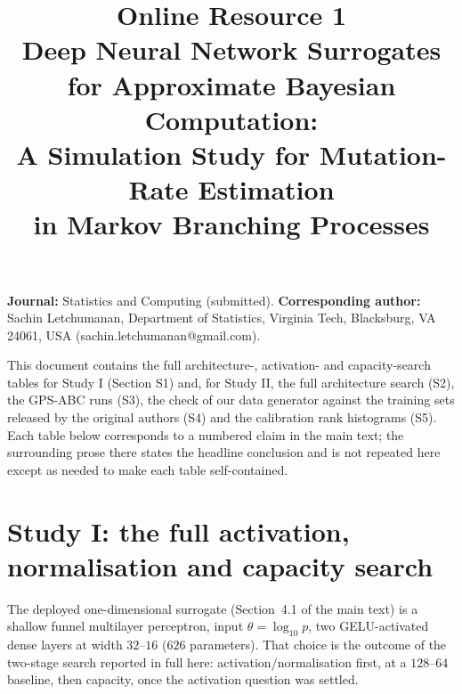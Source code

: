 \documentclass[11pt]{article}
\title{Online Resource 1\\
\large Deep Neural Network Surrogates for Approximate Bayesian Computation:\\
A Simulation Study for Mutation-Rate Estimation\\
in Markov Branching Processes}
\author{}
\date{}
\begin{document}
\maketitle

\noindent \textbf{Journal:} Statistics and Computing (submitted).
\textbf{Corresponding author:} Sachin Letchumanan, Department of Statistics, Virginia Tech, Blacksburg, VA 24061, USA (sachin.letchumanan@gmail.com).

\noindent This document contains the full architecture-, activation- and capacity-search tables for Study I
(Section S1) and, for Study II, the full architecture search (S2), the GPS-ABC runs (S3), the check of our
data generator against the training sets released by the original authors (S4) and the calibration rank
histograms (S5). Each table below corresponds to a numbered claim in the main text; the surrounding prose
there states the headline conclusion and is not repeated here except as needed to make each table self-contained.

\section{Study I: the full activation, normalisation and capacity search}
\label{ssec:s1-1d-arch}

The deployed one-dimensional surrogate (Section~4.1 of the main text) is a
shallow funnel multilayer perceptron, input $\theta=\log_{10}p$, two
GELU-activated dense layers at width $32$--$16$ ($626$ parameters). That
choice is the outcome of the two-stage search reported in full here:
activation/normalisation first, at a $128$--$64$ baseline, then capacity,
once the activation question was settled.

\begin{table}[h]
\centering
\caption{Architecture search, one-dimensional model: mean-curve fit MSE
against the denoised response curve (irreducible replicate-noise floor
$\approx 4.7\times 10^{-3}$).}
\label{stab:arch1D}
\end{table}
\end{document}
